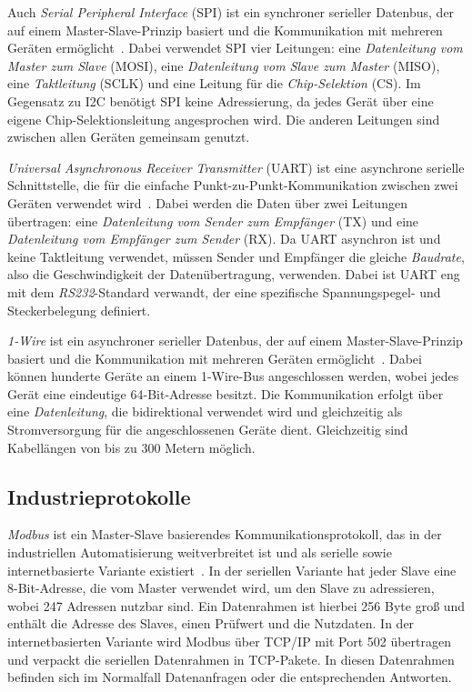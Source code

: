 \pagebreak

Auch \emph{Serial Peripheral Interface} (SPI) ist ein synchroner serieller Datenbus, der auf einem Master-Slave-Prinzip basiert und die Kommunikation mit mehreren Geräten ermöglicht~\cite{SPIProtocol}.
Dabei verwendet SPI vier Leitungen: eine \emph{Datenleitung vom Master zum Slave} (MOSI), eine \emph{Datenleitung vom Slave zum Master} (MISO), eine \emph{Taktleitung} (SCLK) und eine Leitung für die \emph{Chip-Selektion} (CS).
Im Gegensatz zu I2C benötigt SPI keine Adressierung, da jedes Gerät über eine eigene Chip-Selektionsleitung angesprochen wird.
Die anderen Leitungen sind zwischen allen Geräten gemeinsam genutzt.

\emph{Universal Asynchronous Receiver Transmitter} (UART) ist eine asynchrone serielle Schnittstelle, die für die einfache Punkt-zu-Punkt-Kommunikation zwischen zwei Geräten verwendet wird~\cite{UARTProtocol}.
Dabei werden die Daten über zwei Leitungen übertragen: eine \emph{Datenleitung vom Sender zum Empfänger} (TX) und eine \emph{Datenleitung vom Empfänger zum Sender} (RX).
Da UART asynchron ist und keine Taktleitung verwendet, müssen Sender und Empfänger die gleiche \emph{Baudrate}, also die Geschwindigkeit der Datenübertragung, verwenden.
Dabei ist UART eng mit dem \emph{RS232}-Standard verwandt, der eine spezifische Spannungspegel- und Steckerbelegung definiert.

\emph{1-Wire} ist ein asynchroner serieller Datenbus, der auf einem Master-Slave-Prinzip basiert und die Kommunikation mit mehreren Geräten ermöglicht~\cite{OneWireProtocol}.
Dabei können hunderte Geräte an einem 1-Wire-Bus angeschlossen werden, wobei jedes Gerät eine eindeutige 64-Bit-Adresse besitzt.
Die Kommunikation erfolgt über eine \emph{Datenleitung}, die bidirektional verwendet wird und gleichzeitig als Stromversorgung für die angeschlossenen Geräte dient.
Gleichzeitig sind Kabellängen von bis zu 300 Metern möglich.


\subsection*{Industrieprotokolle}
\emph{Modbus} ist ein Master-Slave basierendes Kommunikationsprotokoll, das in der industriellen Automatisierung weitverbreitet ist und als serielle sowie internetbasierte Variante existiert~\cite{Modbus}.
In der seriellen Variante hat jeder Slave eine 8-Bit-Adresse, die vom Master verwendet wird, um den Slave zu adressieren, wobei 247 Adressen nutzbar sind.
Ein Datenrahmen ist hierbei 256 Byte groß und enthält die Adresse des Slaves, einen Prüfwert und die Nutzdaten.
In der internetbasierten Variante wird Modbus über TCP/IP mit Port 502 übertragen und verpackt die seriellen Datenrahmen in TCP-Pakete.
In diesen Datenrahmen befinden sich im Normalfall Datenanfragen oder die entsprechenden Antworten.

